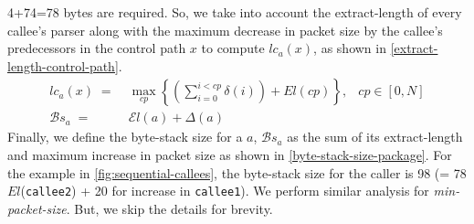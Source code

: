 \documentclass[letterpaper,twocolumn,10pt]{article}
\begin{document}
4+74=78 bytes are required.
So, we take into account the extract-length of every callee's
parser along with the maximum decrease in packet size by the callee's
predecessors in the control path $x$ to compute $lc_{a}(x)$,
as shown in \cref{extract-length-control-path}.
\begin{align}
lc_{a}(x) \; =& \; \max_{cp} \left\{ \left( \sum_{i=0}^{i<cp} \delta(i) \right)+ El(cp) \right\},&cp \in [0,N] \label{extract-length-control-path} \\
\mathcal{B}s_{a} \; =& \; \mathcal{E}l(a) + \Delta(a) & \label{byte-stack-size-package}
\end{align}
Finally, we define the byte-stack size for a \uprogram $a$,
$\mathcal{B}s_{a}$  as the sum of its extract-length and maximum
increase in packet size as shown in \cref{byte-stack-size-package}.
For the example in \cref{fig:sequential-callees}, the byte-stack size
for the caller is 98 (= 78 $El$(\texttt{callee2}) + 20 for increase in
\texttt{callee1}).
We perform similar analysis for \textit{min-packet-size}. But, we skip
the details for brevity.
\end{document}
